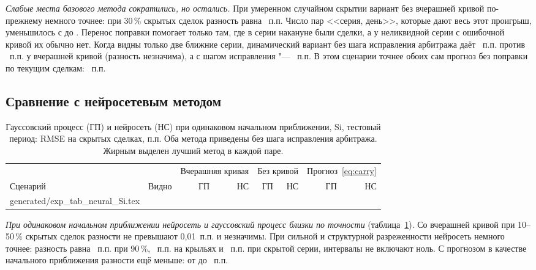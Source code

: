 \documentclass{article}
\makeatletter
\newcommand{\rows}[1]{\@@input generated/#1 }
\makeatother
\begin{document}
\emph{Слабые места базового метода сократились, но остались.} При умеренном случайном скрытии вариант без вчерашней кривой по-прежнему немного точнее: при 30\,\% скрытых сделок разность равна ~п.п. Число пар <<серия, день>>, которые дают весь этот проигрыш, уменьшилось с  до . Перенос поправки помогает только там, где в серии накануне были сделки, а у неликвидной серии с ошибочной кривой их обычно нет. Когда видны только две ближние серии, динамический вариант без шага исправления арбитража даёт ~п.п. против ~п.п. у вчерашней кривой (разность незначима), а с шагом исправления "--- ~п.п. В этом сценарии точнее обоих сам прогноз без поправки по текущим сделкам: ~п.п.

\subsection{Сравнение с нейросетевым методом}\label{sec:neural}

\begin{table}[h]
\caption{Гауссовский процесс (ГП) и нейросеть (НС) при одинаковом начальном приближении, Si, тестовый период: RMSE на скрытых сделках, п.п. Оба метода приведены без шага исправления арбитража. Жирным выделен лучший метод в каждой паре.}\label{tab:neural}
\centering\footnotesize
\setlength{\tabcolsep}{4pt}
\begin{tabular}{lrrrrrrr}
\toprule
 & & \multicolumn{2}{c}{Вчерашняя кривая} & \multicolumn{2}{c}{Без кривой} & \multicolumn{2}{c}{Прогноз~\eqref{eq:carry}} \\
\cmidrule(lr){3-4}\cmidrule(lr){5-6}\cmidrule(lr){7-8}
Сценарий & Видно & ГП & НС & ГП & НС & ГП & НС \\
\midrule
\rows{exp_tab_neural_Si.tex}
\bottomrule
\end{tabular}
\end{table}

\emph{При одинаковом начальном приближении нейросеть и гауссовский процесс близки по точности} (таблица~\ref{tab:neural}). Со вчерашней кривой при 10--50\,\% скрытых сделок разности не превышают 0{,}01~п.п. и незначимы. При сильной и структурной разреженности нейросеть немного точнее: разность равна ~п.п. при 90\,\%, ~п.п. на крыльях и ~п.п. при скрытой серии, интервалы не включают ноль. С прогнозом в качестве начального приближения разности ещё меньше: от  до ~п.п.
\end{document}
